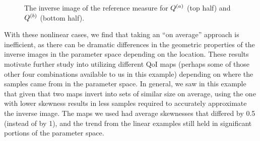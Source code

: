 \begin{figure}[h]
\caption{The inverse image of the reference measure for $Q^{(a)}$ (top half) and $Q^{(b)}$ (bottom half). }
\label{fig:heatrod-convergence}
\end{figure}

With these nonlinear cases, we find that taking an ``on average'' approach is inefficient, as there can be dramatic differences in the geometric properties of the inverse images in the parameter space depending on the location.
These results motivate further study into utilizing different QoI maps (perhaps some of those other four combinations available to us in this example) depending on where the samples came from in the parameter space.
In general, we saw in this example that given that two maps invert into sets of similar size on average, using the one with lower skewness results in less samples required to accurately approximate the inverse image.
The maps we used had average skewnesses that differed by 0.5 (instead of by 1), and the trend from the linear examples still held in significant portions of the parameter space.
